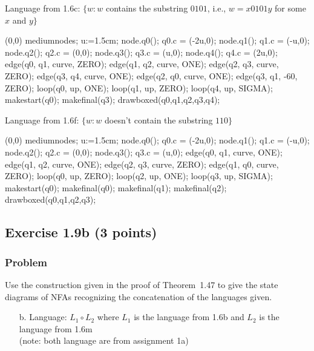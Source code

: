 \documentclass{article}
\begin{document}
\begin{empfile}
\begin{itemize}
Language from 1.6c: $\{w:w$ contains the substring $0101$, i.e.,
$w=x0101y$ for some $x$ and $y\}$

	\begin{center}
	\begin{emp}(0,0)
	mediumnodes;
	u:=1.5cm;
	node.q0(); q0.c = (-2u,0);
	node.q1(); q1.c = (-u,0);
	node.q2(); q2.c = (0,0);
	node.q3(); q3.c = (u,0);
	node.q4(); q4.c = (2u,0);
	edge(q0, q1, curve, ZERO);
	edge(q1, q2, curve, ONE);
	edge(q2, q3, curve, ZERO);
	edge(q3, q4, curve, ONE);
	edge(q2, q0, curve, ONE);
	edge(q3, q1, -60, ZERO);
	loop(q0, up, ONE);
	loop(q1, up, ZERO);
	loop(q4, up, SIGMA);
	makestart(q0);
	makefinal(q3);
	drawboxed(q0,q1,q2,q3,q4);
	\end{emp}
	\end{center}

Language from 1.6f: $\{w:w$ doesn't contain the substring $110\}$
\end{itemize}

	\begin{center}
	\begin{emp}(0,0)
	mediumnodes;
	u:=1.5cm;
	node.q0(); q0.c = (-2u,0);
	node.q1(); q1.c = (-u,0);
	node.q2(); q2.c = (0,0);
	node.q3(); q3.c = (u,0);
	edge(q0, q1, curve, ONE);
	edge(q1, q2, curve, ONE);
	edge(q2, q3, curve, ZERO);
	edge(q1, q0, curve, ZERO);
	loop(q0, up, ZERO);
	loop(q2, up, ONE);
	loop(q3, up, SIGMA);
	makestart(q0);
	makefinal(q0);
	makefinal(q1);
	makefinal(q2);
	drawboxed(q0,q1,q2,q3);
	\end{emp}
	\end{center}

\subsection*{Exercise 1.9b (3 points)}

\subsubsection*{Problem}

Use the construction given in the proof of Theorem~1.47 to give the
state diagrams of NFAs recognizing the concatenation of the
languages given.

\begin{itemize}
\item[b.] Language: $L_1\circ L_2$ where $L_1$ is the language from
1.6b and $L_2$ is the language from 1.6m \\ (note: both language are
from assignment 1a)


\end{itemize}
\end{empfile}
\end{document}
